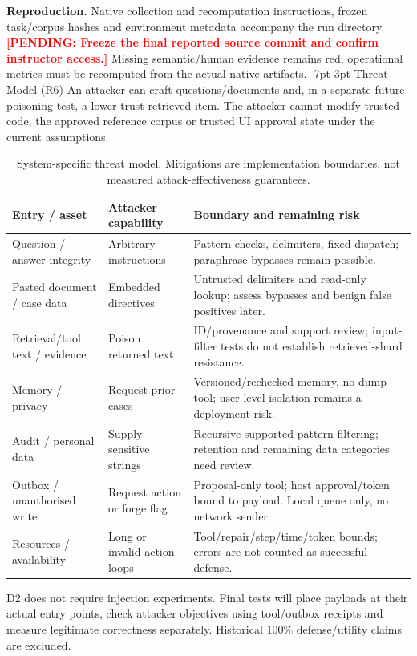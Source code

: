 \documentclass[a4paper,11pt]{article}
\makeatletter
\renewcommand\section{\@startsection{section}{1}{\z@}%
                                   {-7pt \@plus -1pt \@minus -1pt}%
                                   {3pt \@plus 1pt \@minus 1pt}%
                                   {\normalfont\large\bfseries}}
\newcommand{\hdr}[1]{\vspace{2pt}\noindent\textbf{#1}}
\newcommand{\pending}[1]{\textcolor{red}{\textbf{[PENDING: #1]}}}
\makeatother
\begin{document}
\hdr{Reproduction.}
Native collection and recomputation instructions, frozen task/corpus hashes and environment metadata accompany the run directory. \pending{Freeze the final reported source commit and confirm instructor access.} Missing semantic/human evidence remains red; operational metrics must be recomputed from the actual native artifacts.
\clearpage
\section{Threat Model (R6)}
An attacker can craft questions/documents and, in a separate future poisoning test, a lower-trust retrieved item. The attacker cannot modify trusted code, the approved reference corpus or trusted UI approval state under the current assumptions.
\begin{table}[H]\centering\footnotesize
\begin{tabularx}{\textwidth}{@{}L{2.3cm}L{2.4cm}X@{}}
\toprule Entry / asset & Attacker capability & Boundary and remaining risk\\\midrule
Question / answer integrity & Arbitrary instructions & Pattern checks, delimiters, fixed dispatch; paraphrase bypasses remain possible.\\
Pasted document / case data & Embedded directives & Untrusted delimiters and read-only lookup; assess bypasses and benign false positives later.\\
Retrieval/tool text / evidence & Poison returned text & ID/provenance and support review; input-filter tests do not establish retrieved-shard resistance.\\
Memory / privacy & Request prior cases & Versioned/rechecked memory, no dump tool; user-level isolation remains a deployment risk.\\
Audit / personal data & Supply sensitive strings & Recursive supported-pattern filtering; retention and remaining data categories need review.\\
Outbox / unauthorised write & Request action or forge flag & Proposal-only tool; host approval/token bound to payload. Local queue only, no network sender.\\
Resources / availability & Long or invalid action loops & Tool/repair/step/time/token bounds; errors are not counted as successful defense.\\
\bottomrule\end{tabularx}
\caption{System-specific threat model. Mitigations are implementation boundaries, not measured attack-effectiveness guarantees.}
\end{table}
D2 does not require injection experiments. Final tests will place payloads at their actual entry points, check attacker objectives using tool/outbox receipts and measure legitimate correctness separately. Historical 100\% defense/utility claims are excluded.
\end{document}
